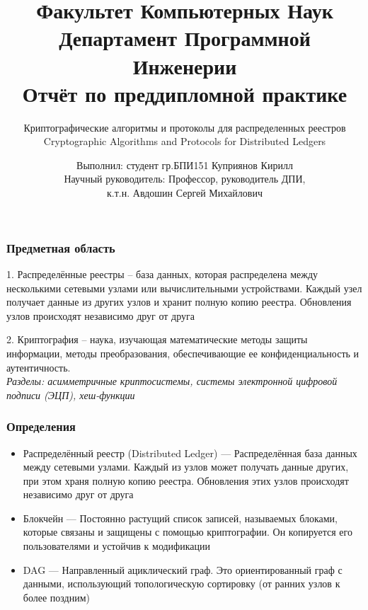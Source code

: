\documentclass{beamer}
\title[Заголовок]{\footnotesize Факультет Компьютерных Наук\\Департамент
Программной Инженерии\\Отчёт по преддипломной практике}
\subtitle{Криптографические алгоритмы и протоколы для распределенных реестров\\
Cryptographic Algorithms and Protocols for Distributed Ledgers}
\author[Куприянов К.И.]{\scriptsize Выполнил: студент
гр.БПИ151 Куприянов Кирилл\\Научный руководитель: Профессор, руководитель ДПИ,\\к.т.н. Авдошин Сергей Михайлович}
\institute[Высшая школа экономики]{}
\date{\the\year}
\begin{document}
\frame[plain]{
    \maketitle
}



\begin{frame}
\frametitle{Предметная область}
    \begin{multicols}{2}
        1. Распределённые реестры -- база данных, которая распределена между
        несколькими сетевыми узлами или вычислительными устройствами. Каждый
        узел получает данные из других узлов и хранит полную копию реестра.
        Обновления узлов происходят независимо друг от друга

        \columnbreak

        2. Криптография -- наука, изучающая математические методы защиты
        информации, методы преобразования, обеспечивающие ее конфиденциальность
        и аутентичность.\\
        \emph{Разделы: асимметричные криптосистемы, системы электронной цифровой
        подписи (ЭЦП), хеш-функции}
        \medskip
    \end{multicols}
\end{frame}

\begin{frame}
\frametitle{Определения}
        \begin{itemize}
    \item Распределённый реестр (Distributed Ledger) --- Распределённая база
        данных между сетевыми узлами. Каждый из узлов может получать данные
                других, при этом храня полную копию реестра.  Обновления этих
                узлов происходят независимо друг от друга

    \item Блокчейн --- Постоянно растущий список записей, называемых блоками,
        которые связаны и защищены с помощью криптографии. Он копируется его
                пользователями и устойчив к модификации

    \item DAG --- Направленный ациклический граф. Это ориентированный граф с
        данными, использующий топологическую сортировку (от ранних узлов к
                более поздним)
        \end{itemize}
\end{frame}
\end{document}
